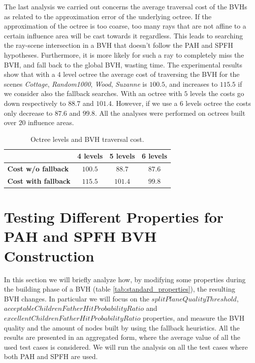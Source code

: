 \documentclass{PoliMi_MasterThesis}
\begin{document}
The last analysis we carried out concerns the average traversal cost of the BVHs as related to the approximation error of the underlying octree. If the approximation of the octree is too coarse, too many rays that are not affine to a certain influence area will be cast towards it regardless. This leads to searching the ray-scene intersection in a BVH that doesn't follow the PAH and SPFH hypotheses. Furthermore, it is more likely for such a ray to completely miss the BVH, and fall back to the global BVH, wasting time. The experimental results show that with a $4$ level octree the average cost of traversing the BVH for the scenes \textit{Cottage}, \textit{Random1000}, \textit{Wood}, \textit{Suzanne} is $100.5$, and increases to $115.5$ if we consider also the fallback searches. With an octree with $5$ levels the costs go down respectively to $88.7$ and $101.4$. However, if we use a $6$ levels octree the costs only decrease to $87.6$ and $99.8$. All the analyses were performed on octrees built over $20$ influence areas.

\begin{table}[H]
    \centering
    \begin{tabular}{|l|c|c|c|}
		\hline
        & \textbf{4 levels} & \textbf{5 levels} &\textbf{6 levels}\\
		\hline \hline
		\textbf{Cost w/o fallback}& $100.5$ & $88.7$ & $87.6$ \\
		\textbf{Cost with fallback} & $115.5$ & $101.4$ & $99.8$ \\
		\hline
    \end{tabular}
	\caption{Octree levels and BVH traversal cost.}
	\label{tab:levels_vs_quality}
\end{table}

\section{Testing Different Properties for PAH and SPFH BVH Construction} \label{sec:testing_different_properties}
In this section we will briefly analyze how, by modifying some properties during the building phase of a BVH (table \ref{tab:standard_properties}), the resulting BVH changes. In particular we will focus on the $splitPlaneQualityThreshold$, $acceptableChildrenFatherHitProbabilityRatio$ and $excellentChildrenFatherHitProbabilityRatio$ properties, and measure the BVH quality and the amount of nodes built by using the fallback heuristics. All the results are presented in an aggregated form, where the average value of all the used test cases is considered. We will run the analysis on all the test cases where both PAH and SPFH are used.
\end{document}

